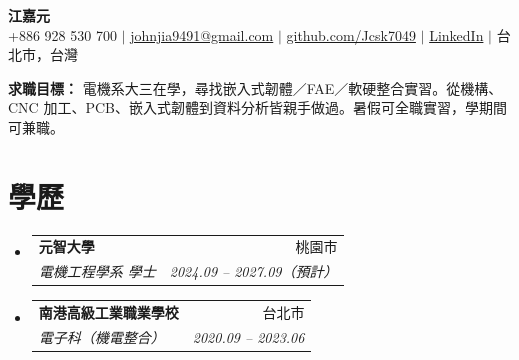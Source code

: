 \documentclass[letterpaper,11pt]{article}
\makeatletter
\newcommand{\resumeSubheading}[4]{
  \vspace{-2pt}\item
    \begin{tabular*}{0.97\textwidth}[t]{l@{\extracolsep{\fill}}r}
      \textbf{#1} & #2 \\
      \textit{\small#3} & \textit{\small #4} \\
    \end{tabular*}\vspace{-3pt}
}
\newcommand{\resumeSubHeadingListStart}{\begin{itemize}[leftmargin=0.0in, label={}]}
\newcommand{\resumeSubHeadingListEnd}{\end{itemize}}
\makeatother
\begin{document}
\begin{center}
    \textbf{\Huge \scshape 江嘉元} \\ \vspace{1pt}
    \small +886 928 530 700 $|$ \href{mailto:johnjia9491@gmail.com}{johnjia9491@gmail.com} $|$
    \href{https://github.com/Jcsk7049}{github.com/Jcsk7049} $|$
    \href{https://linkedin.com/in/\%E5\%98\%89\%E5\%85\%83-\%E6\%B1\%9F-662764344}{LinkedIn} $|$
    台北市，台灣
\end{center}

\vspace{-4pt}
\small{\textbf{求職目標：} 電機系大三在學，尋找嵌入式韌體／FAE／軟硬整合實習。從機構、CNC 加工、PCB、嵌入式韌體到資料分析皆親手做過。暑假可全職實習，學期間可兼職。}
\vspace{2pt}

\section{學歷}
  \resumeSubHeadingListStart
    \resumeSubheading
      {元智大學}{桃園市}
      {電機工程學系 學士}{2024.09 -- 2027.09（預計）}
    \vspace{6pt}
    \resumeSubheading
      {南港高級工業職業學校}{台北市}
      {電子科（機電整合）}{2020.09 -- 2023.06}
  \resumeSubHeadingListEnd

\end{document}
